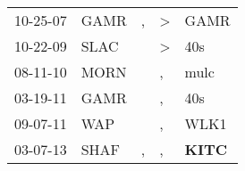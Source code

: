 \begin{supertabular}{p{0.07\textwidth}p{0.06\textwidth}p{0.02\textwidth}p{0.02\textwidth}p{0.06\textwidth}}
 10-25-07\textsuperscript{} &          GAMR\textsuperscript{} &             , &  \textgreater &           GAMR\textsuperscript{} \\
 10-22-09\textsuperscript{} &          SLAC\textsuperscript{} &               &  \textgreater &            40s\textsuperscript{} \\
 08-11-10\textsuperscript{} &          MORN\textsuperscript{} &               &             , &           mulc\textsuperscript{} \\
 03-19-11\textsuperscript{} &          GAMR\textsuperscript{} &               &             , &            40s\textsuperscript{} \\
 09-07-11\textsuperscript{} &           WAP\textsuperscript{} &               &             , &           WLK1\textsuperscript{} \\
 03-07-13\textsuperscript{} &          SHAF\textsuperscript{} &             , &             , &  \textbf{KITC\textsuperscript{}} \\
\end{supertabular}
